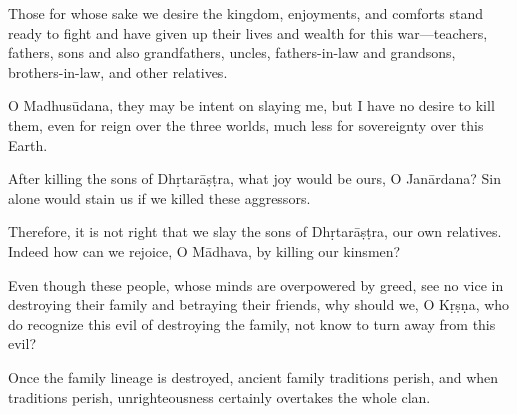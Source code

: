 {Those for whose sake we desire the kingdom, enjoyments, and comforts stand ready to fight and have given up their lives and wealth for this war---teachers, fathers, sons and also grandfathers, uncles, fathers-in-law and grandsons, brothers-in-law, and other relatives.}

{O Madhusūdana, they may be intent on slaying me, but I have no desire to kill them, even for reign over the three worlds, much less for sovereignty over this Earth.}

{After killing the sons of Dhṛtarāṣṭra, what joy would be ours, O Janārdana? Sin alone would stain us if we killed these aggressors.}

{Therefore, it is not right that we slay the sons of Dhṛtarāṣṭra, our own relatives. Indeed how can we rejoice, O Mādhava, by killing our kinsmen?}

{Even though these people, whose minds are overpowered by greed, see no vice in destroying their family and betraying their friends, why should we, O Kṛṣṇa, who do recognize this evil of destroying the family, not know to turn away from this evil?}

{Once the family lineage is destroyed, ancient family traditions perish, and when traditions perish, unrighteousness certainly overtakes the whole clan.}

